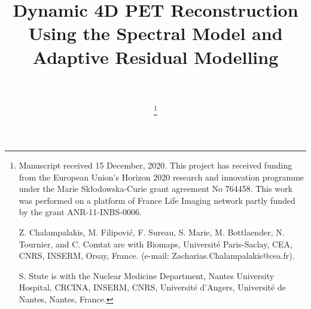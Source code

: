%


\addto\captionsenglish{\renewcommand{\figurename}{Fig.}}


%


\title{\huge Dynamic 4D PET Reconstruction Using the Spectral Model and Adaptive Residual Modelling}

%
\author{\\
\vspace{0.15cm}

\vspace{-0.9cm}

\thanks{Manuscript received 15 December, 2020. 
This project has received funding from the European Union's Horizon 2020 research and innovation programme under the Marie Sk\l{}odowska-Curie grant agreement No 764458. This work was performed on a platform of France Life Imaging network partly funded by the grant ANR-11-INBS-0006.

Z. Chalampalakis, M. Filipović, F. Sureau, S. Marie, M. Bottlaender, N. Tournier, and C. Comtat are with Biomaps, Université Paris-Saclay, CEA, CNRS, INSERM, Orsay, France. (e-mail: Zacharias.Chalampalakis@cea.fr). 

S. Stute is with the Nuclear Medicine Department, Nantes University Hospital, CRCINA, INSERM, CNRS, Université d’Angers, Université de Nantes, Nantes, France. } %
}


